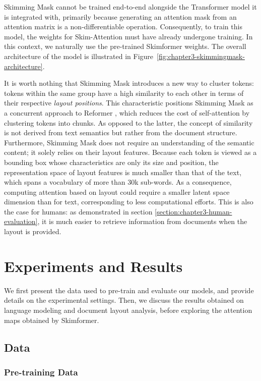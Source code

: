 Skimming Mask cannot be trained end-to-end alongside the Transformer model it is integrated with, primarily because generating an attention mask from an attention matrix is a non-differentiable operation. Consequently, to train this model, the weights for Skim-Attention must have already undergone training. In this context, we naturally use the pre-trained Skimformer weights.  The overall architecture of the model is illustrated in Figure~\ref{fig:chapter3-skimmingmask-architecture}.

It is worth nothing that Skimming Mask introduces a new way to cluster tokens: tokens within the same group have a high similarity to each other in terms of their respective \emph{layout positions}. This characteristic positions Skimming Mask as a concurrent approach to Reformer \citep{kitaev2020reformer}, which reduces the cost of self-attention by clustering tokens into chunks. As opposed to the latter, the concept of similarity is not derived from text semantics but rather from the document structure. Furthermore, Skimming Mask does not require an understanding of the semantic content; it solely relies on their layout features. Because each token is viewed as a bounding box whose characteristics are only its size and position, the representation space of layout features is much smaller than that of the text, which spans a vocabulary of more than 30k sub-words. As a consequence, computing attention based on layout could require a smaller latent space dimension than for text, corresponding to less computational efforts. This is also the case for humans: as demonstrated in section \ref{section:chapter3-human-evaluation}, it is much easier to retrieve information from documents when the layout is provided.


\section{Experiments and Results}

We first present the data used to pre-train and evaluate our models, and provide details on the experimental settings. Then, we discuss the results obtained on language modeling and document layout analysis, before exploring the attention maps obtained by Skimformer.

\subsection{Data}

\subsubsection{Pre-training Data}

